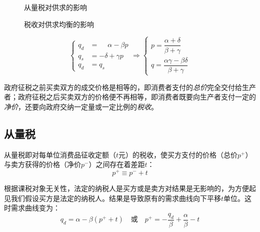 \begin{figure}[!h]
\begin{shaded*}
  \begin{minipage}[t]{0.5\linewidth} 
    \centering 
	    \vspace{0pt}

	\caption{从量税对供求的影响}
	\label{fig:perunitquantitytax}
  \end{minipage}%
  \begin{minipage}[t]{0.5\linewidth} 
    \centering
	    \vspace{0pt}

\caption{税收对供求均衡的影响}
\label{fig:how-tax-effects-market}
  \end{minipage} 
\end{shaded*}
\end{figure}

\begin{equation}
\left\{ \begin{aligned}
{q_d} &= \phantom{{}-}\alpha  - \beta p\\
{q_s} &=  - \delta  + \gamma p\\
{q_d} &= {q_s}
\end{aligned} \right. \Rightarrow \left\{ \begin{array}{l}
p = \dfrac{{\alpha  + \delta }}{{\beta  + \gamma }}\\
q = \dfrac{{\alpha \gamma  - \beta \delta }}{{\beta  + \gamma }}
\end{array} \right.
\end{equation}

政府征税之前买卖双方的成交价格是相等的，即消费者支付的\emph{总价}完全交付给生产者；政府征税之后买卖双方的价格便不再相等，即消费者既要向生产者支付一定的\emph{净价}，还要向政府交纳一定量或一定比例的\emph{税收}。

\subsection{从量税}
\label{sec:perunittax}


从量税即对每单位消费品征收定额（$t$元）的税收，使买方支付的价格（总价$p^+$）与卖方获得的价格（净价$p^-$）之间存在着差距$t$：
\begin{equation}
p^{+} \equiv p^{-} + t
\end{equation}

根据课税对象无关性，法定的纳税人是买方或是卖方对结果是无影响的，为方便起见我们假设买方是法定的纳税人。结果是导致原有的需求曲线向下平移$t$单位。这时需求曲线变为：
\begin{equation}
{q_d} = \alpha  - \beta (p^{+} + t) \quad \text{或} \quad p^{+} =  - \frac{{{q_d}}}{\beta } + \frac{\alpha }{\beta } - t
\end{equation}

